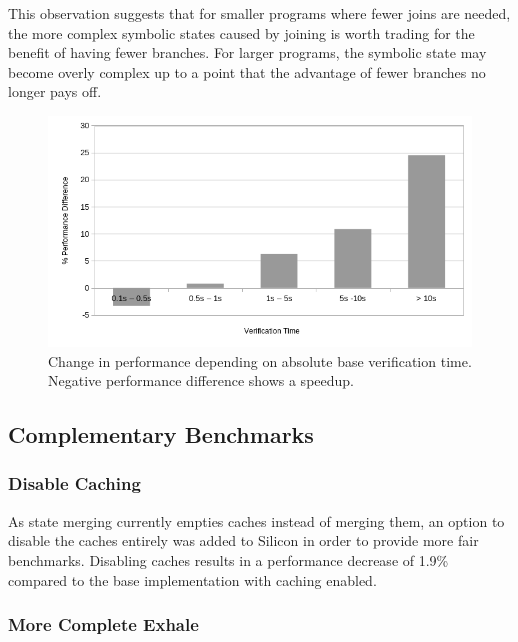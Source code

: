 \documentclass[11pt]{article}
\begin{document}
    This observation suggests that for smaller programs where fewer joins are needed, the more complex symbolic
    states caused by joining is worth trading for the benefit of having fewer branches. For
    larger programs, the symbolic state may become overly complex up to a point that the advantage of
    fewer branches no longer pays off.

    \begin{figure}[H]
        \includegraphics[width=\linewidth]{performance-change-vs-verification-time-part-2.png}
        \caption{
            Change in performance depending on absolute base verification time. Negative performance difference shows a speedup.
        }
        \label{fig:absolute-verification-time}
    \end{figure}

    \subsection{Complementary Benchmarks}

    \subsubsection{Disable Caching}

    As state merging currently empties caches instead of merging them, an option to disable the caches
    entirely was added to Silicon in order to provide more fair benchmarks. Disabling caches results in a performance decrease of 1.9\%
    compared to the base implementation with caching enabled.

    \subsubsection{More Complete Exhale}
\end{document}
